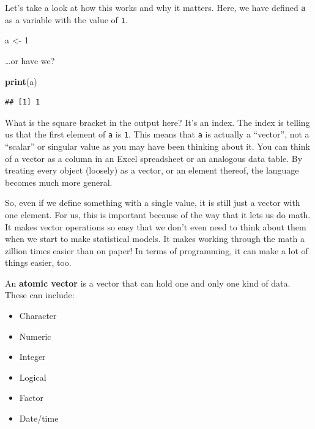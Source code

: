 \documentclass[
]{book}
\newenvironment{Shaded}{\begin{snugshade}}{\end{snugshade}}
\newcommand{\DecValTok}[1]{\textcolor[rgb]{0.00,0.00,0.81}{#1}}
\newcommand{\KeywordTok}[1]{\textcolor[rgb]{0.13,0.29,0.53}{\textbf{#1}}}
\newcommand{\NormalTok}[1]{#1}
\newcommand{\StringTok}[1]{\textcolor[rgb]{0.31,0.60,0.02}{#1}}
\providecommand{\tightlist}{%
  \setlength{\itemsep}{0pt}\setlength{\parskip}{0pt}}
\begin{document}
Let's take a look at how this works and why it matters. Here, we have defined \texttt{a} as a variable with the value of \texttt{1}.

\begin{Shaded}
\begin{Highlighting}[]
\NormalTok{a <-}\StringTok{ }\DecValTok{1}
\end{Highlighting}
\end{Shaded}

\ldots or have we?

\begin{Shaded}
\begin{Highlighting}[]
\KeywordTok{print}\NormalTok{(a)}
\end{Highlighting}
\end{Shaded}

\begin{verbatim}
## [1] 1
\end{verbatim}

What is the square bracket in the output here? It's an index. The index is telling us that the first element of \texttt{a} is \texttt{1}. This means that \texttt{a} is actually a ``vector'', not a ``scalar'' or singular value as you may have been thinking about it. You can think of a vector as a column in an Excel spreadsheet or an analogous data table. By treating every object (loosely) as a vector, or an element thereof, the language becomes much more general.

So, even if we define something with a single value, it is still just a vector with one element. For us, this is important because of the way that it lets us do math. It makes vector operations so easy that we don't even need to think about them when we start to make statistical models. It makes working through the math a zillion times easier than on paper! In terms of programming, it can make a lot of things easier, too.

An \textbf{atomic vector} is a vector that can hold one and only one kind of data. These can include:

\begin{itemize}
\tightlist
\item
  Character
\item
  Numeric
\item
  Integer
\item
  Logical
\item
  Factor
\item
  Date/time
\end{itemize}
\end{document}
